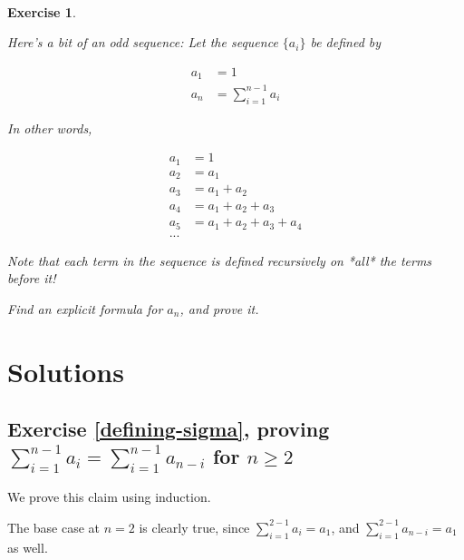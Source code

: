 \documentclass{article}
\newtheorem{exercise}{\\ \bf Exercise}
\begin{document}
\begin{exercise}
\label{sequence-recursive-sum}

Here's a bit of an odd sequence: Let the sequence $\{a_i\}$ be defined by

\begin{align*}
a_1 &= 1 \\
a_{n} &= \sum_{i=1}^{n-1} a_i
\end{align*}

In other words,

\begin{align*}
a_1 &= 1 \\
a_2 &= a_1 \\
a_3 &= a_1 + a_2 \\
a_4 &= a_1 + a_2 + a_3 \\
a_5 &= a_1 + a_2 + a_3 + a_4 \\
...
\end{align*}

Note that each term in the sequence is defined recursively on *all* the terms before it!

Find an explicit formula for $a_n$, and prove it. 



\end{exercise}


\section{Solutions}


\subsection{Exercise \ref{defining-sigma}, proving $\sum_{i=1}^{n-1} a_i = \sum_{i=1}^{n-1} a_{n-i}$ for $n \geq 2$}

We prove this claim using induction. 

The base case at $n = 2$ is clearly true, since $\sum_{i=1}^{2-1} a_i = a_1$, and $\sum_{i=1}^{2-1} a_{n-i} = a_1$ as well. 
\end{document}
